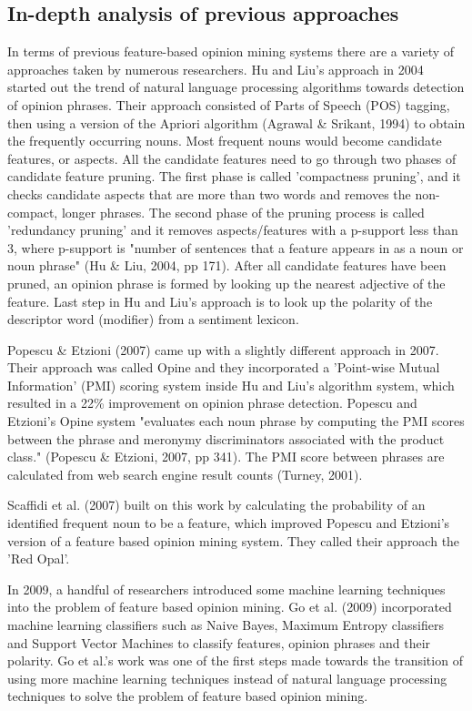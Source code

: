 \documentclass{sig-alternate}
\begin{document}
\subsection{In-depth analysis of previous approaches}
In terms of previous feature-based opinion mining systems there are a variety of approaches taken by numerous researchers. Hu and Liu's approach in 2004 started out the trend of natural language processing algorithms towards detection of opinion phrases. Their approach consisted of Parts of Speech (POS) tagging, then using a version of the Apriori algorithm (Agrawal \& Srikant, 1994) to obtain the frequently occurring nouns. Most frequent nouns would become candidate features, or aspects. All the candidate features need to go through two phases of candidate feature pruning. The first phase is called 'compactness pruning', and it checks candidate aspects that are more than two words and removes the non-compact, longer phrases. The second phase of the pruning process is called 'redundancy pruning' and it removes aspects/features with a p-support less than 3, where p-support is "number of sentences that a feature appears in as a noun or noun phrase" (Hu \& Liu, 2004, pp 171). After all candidate features have been pruned, an opinion phrase is formed by looking up the nearest adjective of the feature. Last step in Hu and Liu's approach is to look up the polarity of the descriptor word (modifier) from a sentiment lexicon. 

Popescu \& Etzioni (2007) came up with a slightly different approach in 2007. Their approach was called Opine and they incorporated a 'Point-wise Mutual Information' (PMI) scoring system inside Hu and Liu's algorithm system, which resulted in a 22\% improvement on opinion phrase detection. Popescu and Etzioni's Opine system "evaluates each noun phrase by computing the PMI scores between the phrase and meronymy discriminators associated with the product class." (Popescu \& Etzioni, 2007, pp 341). The PMI score between phrases are calculated from web search engine result counts (Turney, 2001). 

Scaffidi et al. (2007) built on this work by calculating the probability of an identified frequent noun to be a feature, which improved Popescu and Etzioni's version of a feature based opinion mining system. They called their approach the 'Red Opal'. 

In 2009, a handful of researchers introduced some machine learning techniques into the problem of feature based opinion mining. Go et al. (2009) incorporated machine learning classifiers such as Naive Bayes, Maximum Entropy classifiers and Support Vector Machines to classify features, opinion phrases and their polarity. Go et al.'s work was one of the first steps made towards the transition of using more machine learning techniques instead of natural language processing techniques to solve the problem of feature based opinion mining.
\end{document}
